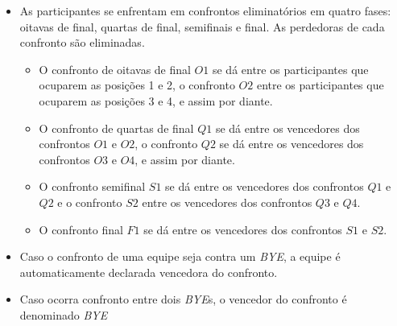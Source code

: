 \begin{itemize}[noitemsep]
	\item As participantes se enfrentam em confrontos eliminatórios em quatro fases: oitavas de final, quartas de final, semifinais e final. As perdedoras de cada confronto são eliminadas.
	\begin{itemize}[noitemsep]
		\item O confronto de oitavas de final $O1$ se dá entre os participantes que ocuparem as posições 1 e 2, o confronto $O2$ entre os participantes que ocuparem as posições 3 e 4, e assim por diante.
		\item O confronto de quartas de final $Q1$ se dá entre os vencedores dos confrontos $O1$ e $O2$, o confronto $Q2$ se dá entre os vencedores dos confrontos $O3$ e $O4$, e assim por diante.
		\item O confronto semifinal $S1$ se dá entre os vencedores dos confrontos $Q1$ e $Q2$ e o confronto $S2$ entre os vencedores dos confrontos $Q3$ e $Q4$.
		\item O confronto final $F1$ se dá entre os vencedores dos confrontos $S1$ e $S2$.
	\end{itemize}

	\item Caso o confronto de uma equipe seja contra um \textit{BYE}, a equipe é automaticamente declarada vencedora do confronto.
	\item Caso ocorra confronto entre dois \textit{BYE}s, o vencedor do confronto é denominado \textit{BYE}
\end{itemize}

